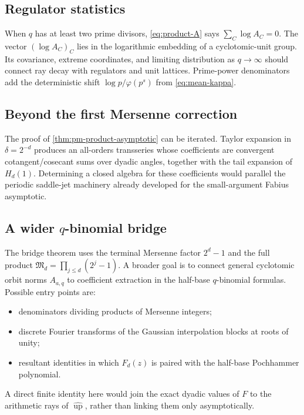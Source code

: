 \documentclass[11pt,oneside]{article}
\theoremstyle{definition}
\theoremstyle{remark}
\newcommand{\Up}{\operatorname{up}}
\begin{document}
\subsection{Regulator statistics}

When $q$ has at least two prime divisors, \eqref{eq:product-A} says
$\sum_C\log A_C=0$. The vector $(\log A_C)_C$ lies in the logarithmic embedding of
a cyclotomic-unit group. Its covariance, extreme coordinates, and limiting
distribution as $q\to\infty$ should connect ray decay with regulators and unit
lattices. Prime-power denominators add the deterministic shift
$\log p/\varphi(p^s)$ from \eqref{eq:mean-kappa}.

\subsection{Beyond the first Mersenne correction}

The proof of \cref{thm:pm-product-asymptotic} can be iterated. Taylor expansion in
$\delta=2^{-d}$ produces an all-orders transseries whose coefficients are convergent
cotangent/cosecant sums over dyadic angles, together with the tail expansion of
$H_d(1)$. Determining a closed algebra for these coefficients would parallel the
periodic saddle-jet machinery already developed for the small-argument Fabius
asymptotic.

\subsection{A wider $q$-binomial bridge}

The bridge theorem uses the terminal Mersenne factor $2^d-1$ and the full product
$\mathfrak M_d=\prod_{j\le d}(2^j-1)$. A broader goal is to connect general
cyclotomic orbit norms $A_{a,q}$ to coefficient extraction in the half-base
$q$-binomial formulas. Possible entry points are:
\begin{itemize}
 \item denominators dividing products of Mersenne integers;
 \item discrete Fourier transforms of the Gaussian interpolation blocks at roots
 of unity;
 \item resultant identities in which $F_d(z)$ is paired with the half-base
 Pochhammer polynomial.
\end{itemize}
A direct finite identity here would join the exact dyadic values of $F$ to the
arithmetic rays of $\widehat{\Up}$, rather than linking them only asymptotically.
\end{document}

